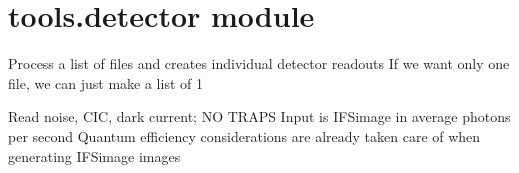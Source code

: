\documentclass[letterpaper,10pt,english]{sphinxmanual}
\begin{document}
\section{tools.detector module}
\label{tools:tools-detector-module}\label{tools:module-tools.detector}

\begin{fulllineitems}
\label{tools:tools.detector.averageDetectorReadout}
Process a list of files and creates individual detector readouts
If we want only one file, we can just make a list of 1

\end{fulllineitems}


\begin{fulllineitems}
\label{tools:tools.detector.readDetector}
Read noise, CIC, dark current; NO TRAPS
Input is IFSimage in average photons per second
Quantum efficiency considerations are already taken care of when
generating IFSimage images

\end{fulllineitems}

\end{document}
